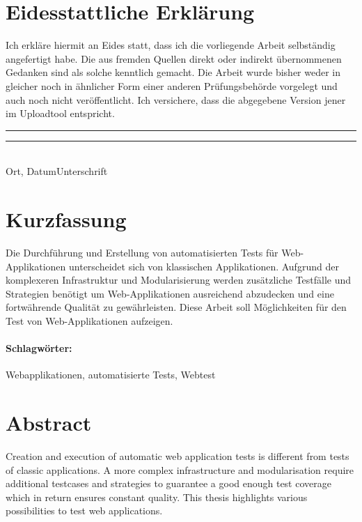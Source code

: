 \documentclass[a4paper,bibtotoc,oneside]{scrbook}
\begin{document}
\newpage


\section*{Eidesstattliche Erklärung}\thispagestyle{empty}
\glqq Ich erkläre hiermit an Eides statt, dass ich die vorliegende Arbeit selbständig angefertigt habe. 
Die aus fremden Quellen direkt oder indirekt übernommenen Gedanken sind als solche kenntlich gemacht. 
Die Arbeit wurde bisher weder in gleicher noch in ähnlicher Form einer anderen Prüfungsbehörde vorgelegt
und auch noch nicht veröffentlicht. Ich versichere, dass die abgegebene Version jener im Uploadtool entspricht.\grqq\\[5\baselineskip]
\rule{5cm}{0.2pt}\hfill\rule{5cm}{0.2pt}\\
\phantom{Datum }Ort, Datum\hfill Unterschrift\hspace{15mm}

\newpage


\section*{Kurzfassung}\thispagestyle{empty}
Die Durchführung und Erstellung von automatisierten Tests für Web-Applikationen unterscheidet sich von klassischen Applikationen. Aufgrund der komplexeren Infrastruktur und Modularisierung werden zusätzliche Testfälle und Strategien benötigt um Web-Applikationen ausreichend abzudecken und eine fortwährende Qualität zu gewährleisten. Diese Arbeit soll Möglichkeiten für den Test von Web-Applikationen aufzeigen.

\vfill
\paragraph*{Schlagwörter:} Webapplikationen, automatisierte Tests, Webtest


\newpage

\section*{Abstract}\thispagestyle{empty}
Creation and execution of automatic web application tests is different from tests of classic applications. A more complex infrastructure and modularisation require additional testcases and strategies to guarantee a good enough test coverage which in return ensures constant quality. This thesis highlights various possibilities to test web applications.
\end{document}
